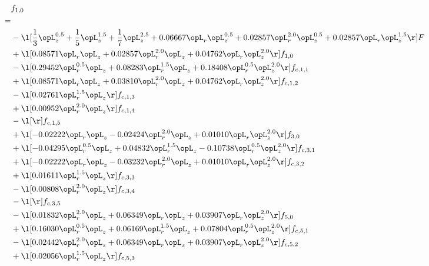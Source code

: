 \begin{alignat}{2} 
\label{eq:f_10_1} 
& f_{1,0} \nonumber \\ 
 = \\ 
& - \l[ \frac{1}{3} \opL_z^{0.5} + \frac{1}{5} \opL_z^{1.5} + \frac{1}{7} \opL_z^{2.5} +  0.06667 \opL_r \opL_z^{0.5} +  0.02857 \opL_r^{2.0} \opL_z^{0.5} +  0.02857 \opL_r \opL_z^{1.5}  \r] F \nonumber \\ 
& + \l[  0.08571 \opL_r \opL_z +  0.02857 \opL_r^{2.0} \opL_z +  0.04762 \opL_r \opL_z^{2.0}  \r] f_{1,0} \nonumber \\ 
& - \l[  0.29452 \opL_r^{0.5} \opL_z +  0.08283 \opL_r^{1.5} \opL_z +  0.18408 \opL_r^{0.5} \opL_z^{2.0}  \r] f_{c,1,1} \nonumber \\ 
& + \l[  0.08571 \opL_r \opL_z +  0.03810 \opL_r^{2.0} \opL_z +  0.04762 \opL_r \opL_z^{2.0}  \r] f_{c,1,2} \nonumber \\ 
& - \l[  0.02761 \opL_r^{1.5} \opL_z  \r] f_{c,1,3} \nonumber \\ 
& + \l[  0.00952 \opL_r^{2.0} \opL_z  \r] f_{c,1,4} \nonumber \\ 
& - \l[  \r] f_{c,1,5} \nonumber \\ 
& + \l[  -0.02222 \opL_r \opL_z   -0.02424 \opL_r^{2.0} \opL_z +  0.01010 \opL_r \opL_z^{2.0}  \r] f_{3,0} \nonumber \\ 
& + \l[  -0.04295 \opL_r^{0.5} \opL_z +  0.04832 \opL_r^{1.5} \opL_z   -0.10738 \opL_r^{0.5} \opL_z^{2.0}  \r] f_{c,3,1} \nonumber \\ 
& + \l[  -0.02222 \opL_r \opL_z   -0.03232 \opL_r^{2.0} \opL_z +  0.01010 \opL_r \opL_z^{2.0}  \r] f_{c,3,2} \nonumber \\ 
& + \l[  0.01611 \opL_r^{1.5} \opL_z  \r] f_{c,3,3} \nonumber \\ 
& - \l[  0.00808 \opL_r^{2.0} \opL_z  \r] f_{c,3,4} \nonumber \\ 
& - \l[  \r] f_{c,3,5} \nonumber \\ 
& - \l[  0.01832 \opL_r^{2.0} \opL_z +  0.06349 \opL_r \opL_z +  0.03907 \opL_r \opL_z^{2.0}  \r] f_{5,0} \nonumber \\ 
& + \l[  0.16030 \opL_r^{0.5} \opL_z +  0.06169 \opL_r^{1.5} \opL_z +  0.07804 \opL_r^{0.5} \opL_z^{2.0}  \r] f_{c,5,1} \nonumber \\ 
& - \l[  0.02442 \opL_r^{2.0} \opL_z +  0.06349 \opL_r \opL_z +  0.03907 \opL_r \opL_z^{2.0}  \r] f_{c,5,2} \nonumber \\ 
& + \l[  0.02056 \opL_r^{1.5} \opL_z  \r] f_{c,5,3} \nonumber \\ 

\end{alignat}
